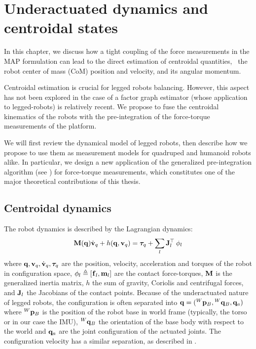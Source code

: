\chapter{Underactuated dynamics and centroidal states}
\label{chp:underactuade_dynamics}
\minitoc
\bigskip

In this chapter, we discuss how a tight coupling of the force measurements in the MAP formulation can lead to the direct estimation
of centroidal quantities, \ie\ the robot center of mass (CoM) position and velocity, and its angular momentum.

Centroidal estimation is crucial for legged robots balancing. However, this aspect has not been explored in the case of a factor graph 
estimator (whose application to legged-robots) is relatively recent. We propose to fuse the centroidal kinematics of the robots with the pre-integration of the force-torque measurements 
of the platform.

We will first review the dynamical model of legged robots, then describe how we propose to use them as measurement models for quadruped and humanoid robots alike.
In particular, we design a new application of the generalized pre-integration algorithm (see ) for force-torque measurements, which constitutes
one of the major theoretical contributions of this thesis.


\section{Centroidal dynamics}
\label{sec:centroidal_dynamics}
The robot dynamics is described by the Lagrangian dynamics:
%
\begin{equation}\label{eq:wbdyn}
  {\bf M}({\bf q}) \dot{{\bf v}}_q + h({\bf q},{\bf v}_q) = \bm\tau_q + \sum_l {\bf J}_l^{\top} \prescript{}{}{\bf \phi}_{l}
\end{equation}
%
where ${\bf q},{\bf v}_q,\dot{{\bf v}}_q,\bm\tau_q$ are the position, velocity, acceleration and torques of the robot in configuration space,
$\prescript{}{}{\bf \phi}_{l} \triangleq [\prescript{}{}{{\bf f}}_{l},{\bf m}_l]$ are the contact force-torques,
${\bf M}$ is the generalized inertia matrix, $h$ the sum of gravity, Coriolis and centrifugal forces, and ${\bf J}_l$ the Jacobians of the contact points.
Because of the underactuated nature of legged robots, the configuration is often separated into ${\bf q}=(\prescript{W}{}{{\bf p}}_{B}, \prescript{W}{}{{\bf q}}_B ,{\bf q}_a)$ where $\prescript{W}{}{{\bf p}}_{B}$ 
is the position of the robot base in world frame (typically, the torso or in our case the IMU), $\prescript{W}{}{{\bf q}}_B$ the orientation of the base body with respect 
to the world and ${\bf q}_a$ are the joint configuration of the actuated joints. The configuration velocity has a similar separation, as described in .

